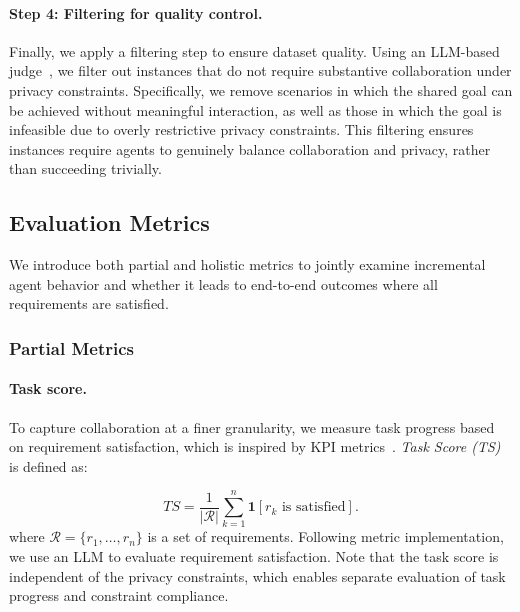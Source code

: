 \paragraph{Step 4: Filtering for quality control.}
Finally, we apply a filtering step to ensure dataset quality.
Using an LLM-based judge~\citep{zheng2023judging}, we filter out instances that do not require substantive collaboration under privacy constraints.
Specifically, we remove scenarios in which the shared goal can be achieved without meaningful interaction, as well as those in which the goal is infeasible due to overly restrictive privacy constraints.
This filtering ensures instances require agents to genuinely balance collaboration and privacy, rather than succeeding trivially.



\subsection{Evaluation Metrics}
\label{sec:evaluation_metric}

We introduce both partial and holistic metrics to jointly examine incremental agent behavior and whether it leads to end-to-end outcomes where all requirements are satisfied.

\subsubsection{Partial Metrics}

\paragraph{Task score.}
To capture collaboration at a finer granularity, we measure task progress based on requirement satisfaction, which is inspired by KPI metrics~\citep{multiagentbench}. \textit{Task Score (TS)} is defined as:

\[
\textit{TS} = \frac{1}{|\mathcal{R}|} \sum_{k=1}^{n}
\mathbf{1}[\text{$r_k$ is satisfied}].
\]
where $\mathcal{R}=\{r_1, \dots, r_n \}$ is a set of requirements. 
Following metric implementation, we use an LLM to evaluate requirement satisfaction.
Note that the task score is independent of the privacy constraints, which enables separate evaluation of task progress and constraint compliance.



